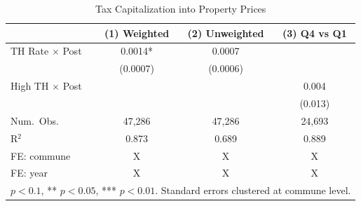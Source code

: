 \begin{table}[htbp]
\centering
\caption{Tax Capitalization into Property Prices}
\label{tab:capitalization}
\begin{tabular}{lccc}
\toprule
 & (1) Weighted & (2) Unweighted & (3) Q4 vs Q1 \\
\midrule
TH Rate $\times$ Post & 0.0014* & 0.0007 &  \\
 & (0.0007) & (0.0006) &  \\
High TH $\times$ Post &  &  & 0.004 \\
 &  &  & (0.013) \\
\midrule
Num.\ Obs. & 47,286 & 47,286 & 24,693 \\
R$^2$ & 0.873 & 0.689 & 0.889 \\
FE: commune & X & X & X \\
FE: year & X & X & X \\
\bottomrule
\multicolumn{4}{l}{\footnotesize * $p < 0.1$, ** $p < 0.05$, *** $p < 0.01$. Standard errors clustered at commune level.}
\end{tabular}
\end{table}
